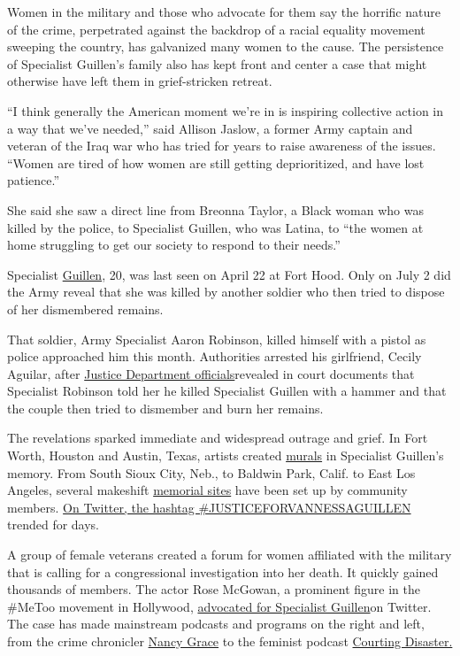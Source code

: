 Women in the military and those who advocate for them say the horrific
nature of the crime, perpetrated against the backdrop of a racial
equality movement sweeping the country, has galvanized many women to the
cause. The persistence of Specialist Guillen's family also has kept
front and center a case that might otherwise have left them in
grief-stricken retreat.

``I think generally the American moment we're in is inspiring collective
action in a way that we've needed,'' said Allison Jaslow, a former Army
captain and veteran of the Iraq war who has tried for years to raise
awareness of the issues. ``Women are tired of how women are still
getting deprioritized, and have lost patience.''

She said she saw a direct line from Breonna Taylor, a Black woman who
was killed by the police, to Specialist Guillen, who was Latina, to
``the women at home struggling to get our society to respond to their
needs.''

Specialist
\href{https://www.nytimes.com/article/vanessa-guillen-fort-hood.html}{Guillen},
20, was last seen on April 22 at Fort Hood. Only on July 2 did the Army
reveal that she was killed by another soldier who then tried to dispose
of her dismembered remains.

That soldier, Army Specialist Aaron Robinson, killed himself with a
pistol as police approached him this month. Authorities arrested his
girlfriend, Cecily Aguilar, after
\href{https://www.justice.gov/usao-wdtx/pr/killeen-woman-faces-federal-charge-connection-disappearance-us-army-specialist-vanessa}{Justice
Department officials}revealed in court documents that Specialist
Robinson told her he killed Specialist Guillen with a hammer and that
the couple then tried to dismember and burn her remains.

The revelations sparked immediate and widespread outrage and grief. In
Fort Worth, Houston and Austin, Texas, artists created
\href{https://twitter.com/juanitoferia/status/1280646434069544965}{murals}
in Specialist Guillen's memory. From South Sioux City, Neb., to Baldwin
Park, Calif. to East Los Angeles, several makeshift
\href{https://twitter.com/BaldwinPNews/status/1280305557371408384}{memorial
sites} have been set up by community members.
\href{https://twitter.com/hashtag/JUSTICEFORVANNESSAGUILLEN?src=hashtag_click}{On
Twitter, the hashtag \#JUSTICEFORVANNESSAGUILLEN} trended for days.

A group of female veterans created a forum for women affiliated with the
military that is calling for a congressional investigation into her
death. It quickly gained thousands of members. The actor Rose McGowan, a
prominent figure in the \#MeToo movement in Hollywood,
\href{https://twitter.com/rosemcgowan/status/1279466856479367175}{advocated
for Specialist Guillen}on Twitter. The case has made mainstream podcasts
and programs on the right and left, from the crime chronicler
\href{https://www.stitcher.com/podcast/mrw-productions-llc/crime-stories-with-nancy-grace/e/69241337}{Nancy
Grace} to the feminist podcast
\href{https://crooked.com/podcast/courting-disaster/}{Courting
Disaster.}


